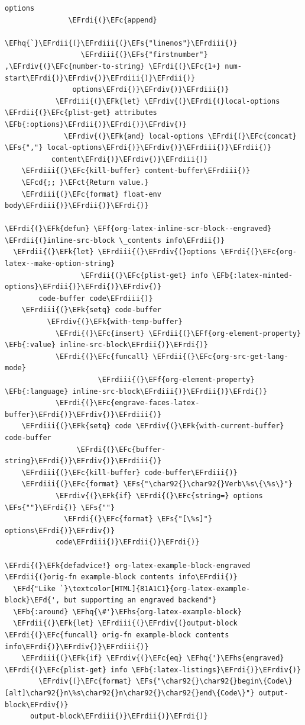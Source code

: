 \documentclass{scrartcl}
\newcommand{\EFk}[1]{\textcolor{EFk}{#1}} %
\newcommand{\EFd}[1]{\textcolor{EFd}{#1}} %
\newcommand{\EFs}[1]{\textcolor{EFs}{#1}} %
\newcommand{\EFb}[1]{\textcolor{EFb}{#1}} %
\newcommand{\EFct}[1]{\textcolor{EFct}{#1}} %
\newcommand{\EFc}[1]{\textcolor{EFc}{#1}} %
\newcommand{\EFf}[1]{\textcolor{EFf}{#1}} %
\newcommand{\EFcd}[1]{\textcolor{EFcd}{#1}} %
\newcommand{\EFhq}[1]{#1} %
\newcommand{\EFhs}[1]{#1} %
\newcommand{\EFrdi}[1]{#1} %
\newcommand{\EFrdii}[1]{#1} %
\newcommand{\EFrdiii}[1]{#1} %
\newcommand{\EFrdiv}[1]{#1} %
\begin{document}
\begin{Code}
\begin{Verbatim}[]
                 options
               \EFrdi{(}\EFc{append}
                \EFhq{`}\EFrdii{(}\EFrdiii{(}\EFs{"linenos"}\EFrdiii{)}
                  \EFrdiii{(}\EFs{"firstnumber"} ,\EFrdiv{(}\EFc{number-to-string} \EFrdi{(}\EFc{1+} num-start\EFrdi{)}\EFrdiv{)}\EFrdiii{)}\EFrdii{)}
                options\EFrdi{)}\EFrdiv{)}\EFrdiii{)}
            \EFrdiii{(}\EFk{let} \EFrdiv{(}\EFrdi{(}local-options \EFrdii{(}\EFc{plist-get} attributes \EFb{:options}\EFrdii{)}\EFrdi{)}\EFrdiv{)}
              \EFrdiv{(}\EFk{and} local-options \EFrdi{(}\EFc{concat} \EFs{","} local-options\EFrdi{)}\EFrdiv{)}\EFrdiii{)}\EFrdii{)}
           content\EFrdi{)}\EFrdiv{)}\EFrdiii{)}
    \EFrdiii{(}\EFc{kill-buffer} content-buffer\EFrdiii{)}
    \EFcd{;; }\EFct{Return value.}
    \EFrdiii{(}\EFc{format} float-env body\EFrdiii{)}\EFrdii{)}\EFrdi{)}

\EFrdi{(}\EFk{defun} \EFf{org-latex-inline-scr-block--engraved} \EFrdii{(}inline-src-block \_contents info\EFrdii{)}
  \EFrdii{(}\EFk{let} \EFrdiii{(}\EFrdiv{(}options \EFrdi{(}\EFc{org-latex--make-option-string}
                  \EFrdii{(}\EFc{plist-get} info \EFb{:latex-minted-options}\EFrdii{)}\EFrdi{)}\EFrdiv{)}
        code-buffer code\EFrdiii{)}
    \EFrdiii{(}\EFk{setq} code-buffer
          \EFrdiv{(}\EFk{with-temp-buffer}
            \EFrdi{(}\EFc{insert} \EFrdii{(}\EFf{org-element-property} \EFb{:value} inline-src-block\EFrdii{)}\EFrdi{)}
            \EFrdi{(}\EFc{funcall} \EFrdii{(}\EFc{org-src-get-lang-mode}
                      \EFrdiii{(}\EFf{org-element-property} \EFb{:language} inline-src-block\EFrdiii{)}\EFrdii{)}\EFrdi{)}
            \EFrdi{(}\EFc{engrave-faces-latex-buffer}\EFrdi{)}\EFrdiv{)}\EFrdiii{)}
    \EFrdiii{(}\EFk{setq} code \EFrdiv{(}\EFk{with-current-buffer} code-buffer
                 \EFrdi{(}\EFc{buffer-string}\EFrdi{)}\EFrdiv{)}\EFrdiii{)}
    \EFrdiii{(}\EFc{kill-buffer} code-buffer\EFrdiii{)}
    \EFrdiii{(}\EFc{format} \EFs{"\char92{}\char92{}Verb\%s\{\%s\}"}
            \EFrdiv{(}\EFk{if} \EFrdi{(}\EFc{string=} options \EFs{""}\EFrdi{)} \EFs{""}
              \EFrdi{(}\EFc{format} \EFs{"[\%s]"} options\EFrdi{)}\EFrdiv{)}
            code\EFrdiii{)}\EFrdii{)}\EFrdi{)}

\EFrdi{(}\EFk{defadvice!} org-latex-example-block-engraved \EFrdii{(}orig-fn example-block contents info\EFrdii{)}
  \EFd{"Like `}\textcolor[HTML]{81A1C1}{org-latex-example-block}\EFd{', but supporting an engraved backend"}
  \EFb{:around} \EFhq{\#'}\EFhs{org-latex-example-block}
  \EFrdii{(}\EFk{let} \EFrdiii{(}\EFrdiv{(}output-block \EFrdi{(}\EFc{funcall} orig-fn example-block contents info\EFrdi{)}\EFrdiv{)}\EFrdiii{)}
    \EFrdiii{(}\EFk{if} \EFrdiv{(}\EFc{eq} \EFhq{'}\EFhs{engraved} \EFrdi{(}\EFc{plist-get} info \EFb{:latex-listings}\EFrdi{)}\EFrdiv{)}
        \EFrdiv{(}\EFc{format} \EFs{"\char92{}\char92{}begin\{Code\}[alt]\char92{}n\%s\char92{}n\char92{}\char92{}end\{Code\}"} output-block\EFrdiv{)}
      output-block\EFrdiii{)}\EFrdii{)}\EFrdi{)}
\end{Verbatim}
\end{Code}
\end{document}
